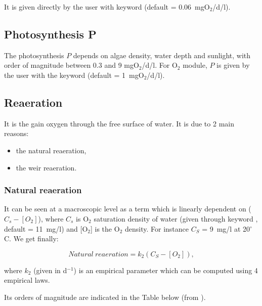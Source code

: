It is given directly by the user with keyword 
(default = 0.06~mgO$_2$/d/l).


\subsection{Photosynthesis P}

The photosynthesis $P$ depends on algae density,
water depth and sunlight,
with order of magnitude between 0.3 and 9 mgO$_2$/d/l.
For O$_2$ module, $P$ is given by the user with the keyword
 (default = 1~mgO$_2$/d/l).


\subsection{Reaeration}

It is the gain oxygen through the free surface of water.
It is due to 2 main reasons:
\begin{itemize}
\item the natural reaeration,
\item the weir reaeration.
\end{itemize}

\subsubsection{Natural reaeration}
It can be seen at a macroscopic level
as a term which is linearly dependent on ($C_s-[O_2]$),
where $C_s$ is O$_2$ saturation density of water
(given through keyword ,
default = 11~mg/l) and [O$_2$] is the O$_2$ density.
For instance $C_S$ = 9~mg/l at 20$^\circ$C.
We get finally:

\begin{equation*}
Natural~reaeration = k_2(C_S-[O_2]),
\end{equation*}

where $k_2$ (given in d$^{-1}$) is an empirical parameter
which can be computed using 4 empirical laws.

Its orders of magnitude are indicated in the Table below
(from \cite{tchobanoglous_wq_1985}).\\

